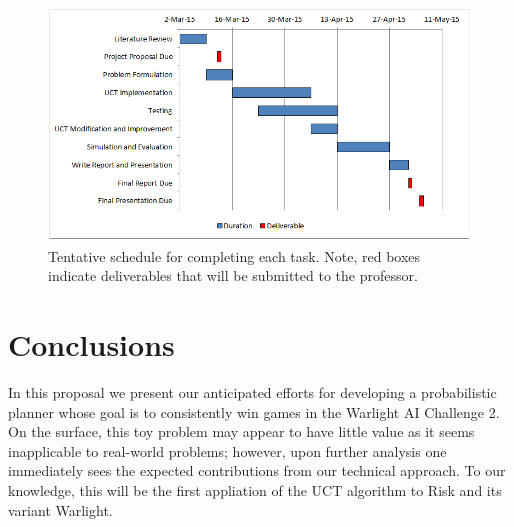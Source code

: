 \documentclass[a4paper,11pt]{article}
\begin{document}
%
\begin{figure}[htbp]
  \centering
  \includegraphics[width=0.95\columnwidth]{gantt_chart}
  \caption{Tentative schedule for completing each task. Note, red boxes indicate deliverables that will be submitted to the professor.}
  \label{fig:schedule}
\end{figure}


%
\section{Conclusions}\label{sec:conclusions}
In this proposal we present our anticipated efforts for developing a probabilistic planner whose goal is to consistently win games in the Warlight AI Challenge 2. On the surface, this toy problem may appear to have little value as it seems inapplicable to real-world problems; however, upon further analysis one immediately sees the expected contributions from our technical approach.  To our knowledge, this will be the first appliation of the UCT algorithm to Risk and its variant Warlight. 




\end{document}
